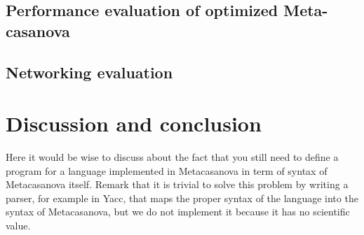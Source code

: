 \documentclass[8pt,a5paper]{extbook}
\begin{document}
\section{Performance evaluation of optimized Meta-casanova}

\section{Networking evaluation}

\chapter{Discussion and conclusion}
Here it would be wise to discuss about the fact that you still need to define a program for a language implemented in Metacasanova in term of syntax of Metacasanova itself. Remark that it is trivial to solve this problem by writing a parser, for example in Yacc, that maps the proper syntax of the language into the syntax of Metacasanova, but we do not implement it because it has no scientific value.



\end{document}
